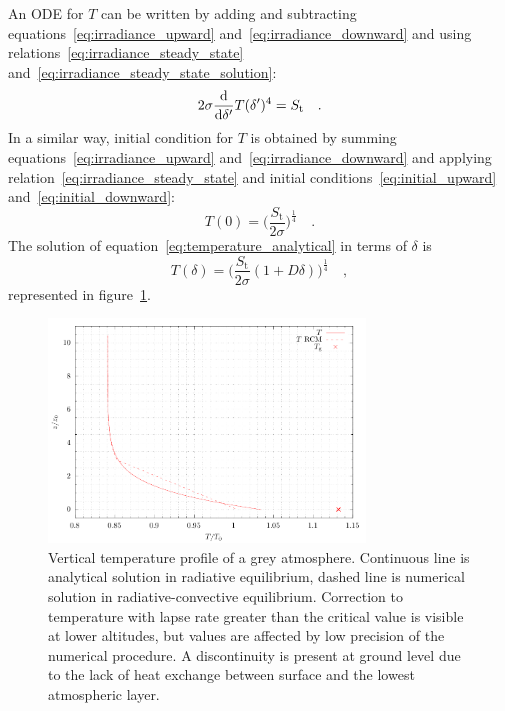 \documentclass[a4paper,10pt,twocolumn,\classoptions]{article}
\begin{document}
An ODE for $T$ can be written by adding and subtracting equations~\eqref{eq:irradiance_upward} and~\eqref{eq:irradiance_downward} and using relations~\eqref{eq:irradiance_steady_state} and~\eqref{eq:irradiance_steady_state_solution}:
\begin{equation}
  \label{eq:temperature_analytical}
  2 \sigma \odv*{T(\delta')^4}{\delta'} = S_\text{t}
  \quad .
\end{equation}
In a similar way, initial condition for $T$ is obtained by summing equations~\eqref{eq:irradiance_upward} and~\eqref{eq:irradiance_downward} and applying relation~\eqref{eq:irradiance_steady_state} and initial conditions~\eqref{eq:initial_upward} and~\eqref{eq:initial_downward}:
\begin{equation}
  \label{eq:initial_temperature}
  T(0) = \bigg( \frac{S_\text{t}}{2 \sigma} \bigg)^\frac{1}{4}
  \quad .
\end{equation}
The solution of equation~\eqref{eq:temperature_analytical} in terms of $\delta$ is
\begin{equation}
  \label{eq:temperature_analytical_solution}
  T(\delta) = \bigg( \frac{S_\text{t}}{2 \sigma} (1 + D \delta) \bigg)^\frac{1}{4}
  \quad ,
\end{equation}
represented in figure~\ref{fig:temperature}.
\begin{figure}[h]
  \centering
  \includegraphics*[keepaspectratio=true,width=0.75\textwidth]{temperature}
  \caption{Vertical temperature profile of a grey atmosphere. Continuous line is analytical solution in radiative equilibrium, dashed line is numerical solution in radiative-convective equilibrium. Correction to temperature with lapse rate greater than the critical value is visible at lower altitudes, but values are affected by low precision of the numerical procedure. A discontinuity is present at ground level due to the lack of heat exchange between surface and the lowest atmospheric layer.}
  \label{fig:temperature}
\end{figure}
\end{document}
